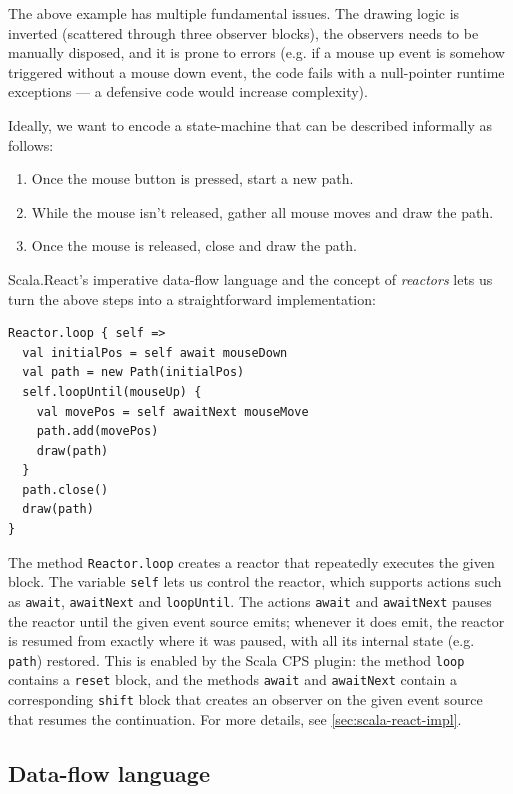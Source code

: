 The above example has multiple fundamental issues. The drawing logic is inverted (scattered through three observer blocks), the observers needs to be manually disposed, and it is prone to errors (e.g. if a mouse up event is somehow triggered without a mouse down event, the code fails with a null-pointer runtime exceptions --- a defensive code would increase complexity).

Ideally, we want to encode a state-machine that can be described informally as follows:
\begin{enumerate}
\item Once the mouse button is pressed, start a new path.
\item While the mouse isn't released, gather all mouse moves and draw the path.
\item Once the mouse is released, close and draw the path.
\end{enumerate}

Scala.React's imperative data-flow language and the concept of \emph{reactors} lets us turn the above steps into a straightforward implementation:

\begin{lstlisting}
Reactor.loop { self =>
  val initialPos = self await mouseDown
  val path = new Path(initialPos)
  self.loopUntil(mouseUp) {
    val movePos = self awaitNext mouseMove
    path.add(movePos)
    draw(path)
  }
  path.close()
  draw(path)
}
\end{lstlisting}

The method \texttt{Reactor.loop} creates a reactor that repeatedly executes the given block. The variable \texttt{self} lets us control the reactor, which supports actions such as \texttt{await}, \texttt{awaitNext} and \texttt{loopUntil}. The actions \texttt{await} and \texttt{awaitNext} pauses the reactor until the given event source emits; whenever it does emit, the reactor is resumed from exactly where it was paused, with all its internal state (e.g. \texttt{path}) restored. This is enabled by the Scala CPS plugin: the method \texttt{loop} contains a \texttt{reset} block, and the methods \texttt{await} and \texttt{awaitNext} contain a corresponding \texttt{shift} block that creates an observer on the given event source that resumes the continuation. For more details, see \ref{sec:scala-react-impl}.

\subsection{Data-flow language}

